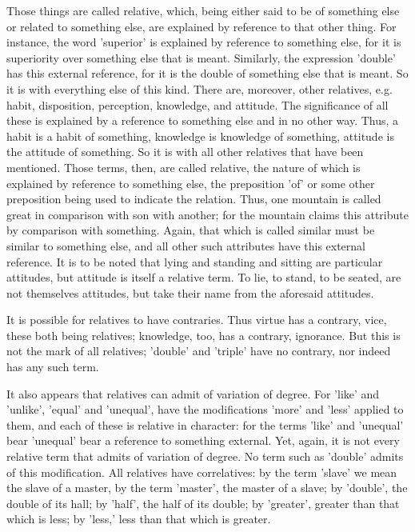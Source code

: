 Those things are called relative, which, being either said to be of
something else or related to something else, are explained by reference
to that other thing. For instance, the word 'superior' is explained by
reference to something else, for it is superiority over something else
that is meant. Similarly, the expression 'double' has this external
reference, for it is the double of something else that is meant. So it
is with everything else of this kind. There are, moreover, other
relatives, e.g. habit, disposition, perception, knowledge, and
attitude. The significance of all these is explained by a reference to
something else and in no other way. Thus, a habit is a habit of
something, knowledge is knowledge of something, attitude is the
attitude of something. So it is with all other relatives that have been
mentioned. Those terms, then, are called relative, the nature of which
is explained by reference to something else, the preposition 'of' or
some other preposition being used to indicate the relation. Thus, one
mountain is called great in comparison with son with another; for the
mountain claims this attribute by comparison with something. Again,
that which is called similar must be similar to something else, and all
other such attributes have this external reference. It is to be noted
that lying and standing and sitting are particular attitudes, but
attitude is itself a relative term. To lie, to stand, to be seated, are
not themselves attitudes, but take their name from the aforesaid
attitudes.

It is possible for relatives to have contraries. Thus virtue has a
contrary, vice, these both being relatives; knowledge, too, has a
contrary, ignorance. But this is not the mark of all relatives;
'double' and 'triple' have no contrary, nor indeed has any such term.

It also appears that relatives can admit of variation of degree. For
'like' and 'unlike', 'equal' and 'unequal', have the modifications
'more' and 'less' applied to them, and each of these is relative in
character: for the terms 'like' and 'unequal' bear 'unequal' bear a
reference to something external. Yet, again, it is not every relative
term that admits of variation of degree. No term such as 'double'
admits of this modification. All relatives have correlatives: by the
term 'slave' we mean the slave of a master, by the term 'master', the
master of a slave; by 'double', the double of its hall; by 'half', the
half of its double; by 'greater', greater than that which is less; by
'less,' less than that which is greater.

